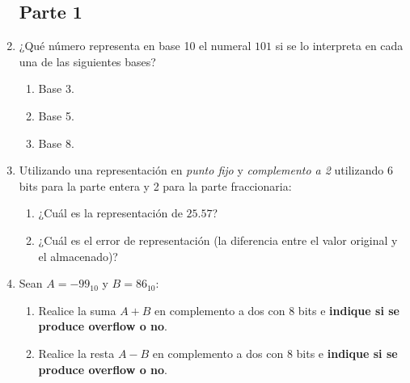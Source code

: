 \documentclass[12pt]{article}
\begin{document}
\begin{enumerate}
\subsection*{Parte 1}

    \item ¿Qué número representa en base 10 el numeral $101$ si se lo
        interpreta en cada una de las siguientes bases?

        \begin{enumerate}

            \item Base 3.

            \item Base 5.

            \item Base 8.

        \end{enumerate}

    \item Utilizando una representación en \emph{punto fijo} y
        \emph{complemento a 2} utilizando 6 bits para la parte entera y 2 para
        la parte fraccionaria:

        \begin{enumerate}

            \item ¿Cuál es la representación de $25.57$?

            \item ¿Cuál es el error de representación (la diferencia entre el
                valor original y el almacenado)?

        \end{enumerate}

    \item Sean $A=-99_{10}$ y $B=86_{10}$:

        \begin{enumerate}

            \item Realice la suma $A+B$ en complemento a dos con 8 bits e
                \textbf{indique si se produce overflow o no}.

            \item Realice la resta $A-B$ en complemento a dos con 8 bits e
                \textbf{indique si se produce overflow o no}.

        \end{enumerate}


\end{enumerate}
\end{document}
